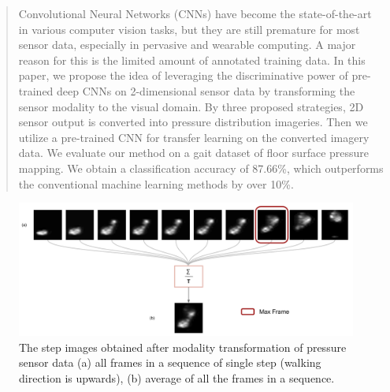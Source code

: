 \documentclass[conference]{IEEEtran}
\begin{document}

\begin{abstract}
Convolutional Neural Networks (CNNs) have become the state-of-the-art in various computer vision tasks, but they are still premature for most sensor data, especially in pervasive and wearable computing. A major reason for this is the limited amount of annotated training data. In this paper, we propose the idea of leveraging the discriminative power of pre-trained deep CNNs on 2-dimensional sensor data by transforming the sensor modality to the visual domain. By three proposed strategies, 2D sensor output is converted into pressure distribution imageries. Then we utilize a pre-trained CNN for transfer learning on the converted imagery data. We evaluate our method on a gait dataset of floor
surface pressure mapping. We obtain a classification accuracy of 87.66\%, which outperforms the conventional machine learning methods by over 10\%. 
\end{abstract}






%
\IEEEpeerreviewmaketitle

\begin{figure}
	\centering
		\includegraphics[width=15cm]{./figures/step_frames.pdf}
	\caption{The step images obtained after modality transformation of pressure sensor data (a) all frames in a sequence of single step (walking direction is upwards), (b) average of all the frames in a sequence.}
	\label{fig:step_frames}
\end{figure}
\end{document}
